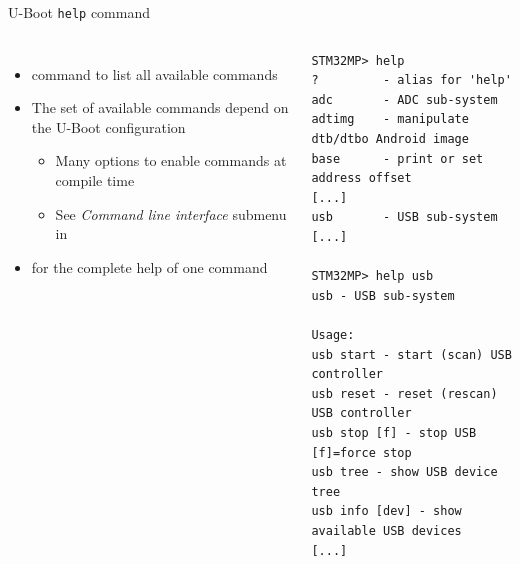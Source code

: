 \begin{frame}[fragile]{U-Boot {\tt help} command}
  \begin{columns}
    \begin{itemize}
    \item {} command to list all available commands
    \item The set of available commands depend on the U-Boot
      configuration
      \begin{itemize}
      \item Many  options to enable commands at
        compile time
      \item See {\em Command line interface} submenu in
      \end{itemize}
    \item {} for the complete help of one command
    \end{itemize}
    \begin{block}{}
      {\tiny
\begin{verbatim}
STM32MP> help
?         - alias for 'help'
adc       - ADC sub-system
adtimg    - manipulate dtb/dtbo Android image
base      - print or set address offset
[...]
usb       - USB sub-system
[...]

STM32MP> help usb
usb - USB sub-system

Usage:
usb start - start (scan) USB controller
usb reset - reset (rescan) USB controller
usb stop [f] - stop USB [f]=force stop
usb tree - show USB device tree
usb info [dev] - show available USB devices
[...]
\end{verbatim}
      }
    \end{block}
  \end{columns}
\end{frame}

